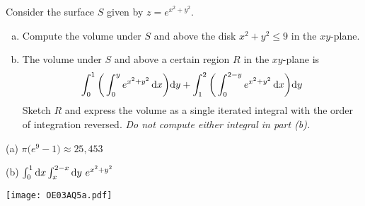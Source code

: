 \begin{question}[M200 2003A] %
Consider the surface $S$ given by $z=e^{x^2+y^2}$.
\begin{enumerate}[(a)]
\item
Compute the volume under $S$ and above the disk $x^2+y^2\le 9$ 
in the $xy$-plane.
\item
The volume under $S$ and above a certain region $R$ in the
$xy$-plane is
\begin{equation*}
\int_0^1\bigg(\int_0^y e^{x^2+y^2}\,\mathrm{d}x\bigg)\mathrm{d}y
+\int_1^2\bigg(\int_0^{2-y} e^{x^2+y^2}\,\mathrm{d}x\bigg)\mathrm{d}y
\end{equation*}
Sketch $R$ and express the volume as a single iterated integral with the
order of integration reversed. \emph{Do not compute either integral in part
(b).}
\end{enumerate}
\end{question}

%

\begin{answer}
(a) $\pi\big(e^9-1\big)\approx 25,453$

(b) $\int_0^1 \dee{x}\int_x^{2-x}\dee{y}\ e^{x^2+y^2}$
\begin{center}
     \texttt{[image: OE03AQ5a.pdf]}
\end{center}
\end{answer}

